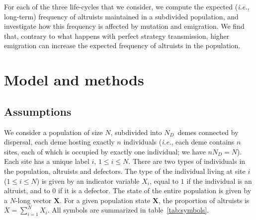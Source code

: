 \documentclass[11pt, letterpaper]{article}
\newcommand{\ie}{\textit{i.e.}}
\newcommand{\ndemes}{N_D}
\begin{document}
For each of the three life-cycles that we consider, we compute the expected (\ie, long-term) frequency of altruists maintained in a subdivided population, and investigate how this frequency is affected by mutation and emigration. We find that, contrary to what happens with perfect strategy transmission, higher emigration can increase the expected frequency of altruists in the population. 




\section{Model and methods}

\subsection{Assumptions}

We consider a population of size $N$, subdivided into $\ndemes$~demes connected by dispersal, each deme hosting exactly $n$ individuals (\ie, each deme contains $n$ sites, each of which is occupied by exactly one individual; we have $n \ndemes = N$). Each site has a unique label $i$, $1\leq i \leq N$. There are two types of individuals in the population, altruists and defectors. The type of the individual living at site $i$ ($1\leq i \leq N$) is given by an indicator variable $X_i$, equal to $1$ if the individual is an altruist, and to $0$ if it is a defector. The state of the entire population is given by a $N$-long vector $\mathbf{X}$. For a given population state $\mathbf{X}$, the proportion of altruists is $\overline{X} = \sum_{i=1}^N X_i$. All symbols are summarized in table~\ref{tab:symbols}.
\end{document}
